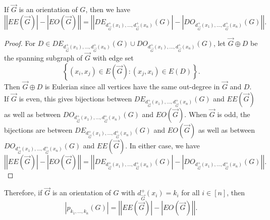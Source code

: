 \documentclass[openany]{tufte-book} %
\theoremstyle{plain}
\newcommand{\setb}[3]{\left\{ #1 \in #2 : #3 \right\}}
\newcommand{\card}[1]{\left|#1\right|}
\newcommand{\irange}[1]{\left[#1\right]}
\begin{document}
\begin{EulerianOrientationsLemma}
If $\vec{G}$ is an orientation of $G$, then we have
\[\card{|EE(\vec{G})| - |EO(\vec{G})|} = \card{|DE_{d_{\vec{G}}^+(x_1), \ldots, d_{\vec{G}}^+(x_n)}(G)|- |DO_{d_{\vec{G}}^+(x_1), \ldots, d_{\vec{G}}^+(x_n)}(G)|}.\]
\end{EulerianOrientationsLemma}
\begin{proof}
	For $D \in DE_{d_{\vec{G}}^+(x_1), \ldots, d_{\vec{G}}^+(x_n)}(G) \cup DO_{d_{\vec{G}}^+(x_1), \ldots, d_{\vec{G}}^+(x_n)}(G)$, let $\vec{G} \oplus D$ be the spanning subgraph of $\vec{G}$ with edge set 
	\[\setb{(x_i,x_j)}{E(\vec{G})}{(x_j,x_i) \in E(D)}.\]
	Then $\vec{G} \oplus D$ is Eulerian since all vertices have the same out-degree in $\vec{G}$ and $D$.  If $\vec{G}$ is even, this gives bijections between $DE_{d_{\vec{G}}^+(x_1), \ldots, d_{\vec{G}}^+(x_n)}(G)$ and $EE(\vec{G})$ as well as between $DO_{d_{\vec{G}}^+(x_1), \ldots, d_{\vec{G}}^+(x_n)}(G)$ and $EO(\vec{G})$.  When $\vec{G}$ is odd, the bijections are between $DE_{d_{\vec{G}}^+(x_1), \ldots, d_{\vec{G}}^+(x_n)}(G)$ and $EO(\vec{G})$ as well as between $DO_{d_{\vec{G}}^+(x_1), \ldots, d_{\vec{G}}^+(x_n)}(G)$ and $EE(\vec{G})$.  In either case, we have
\[\card{|EE(\vec{G})| - |EO(\vec{G})|} = \card{|DE_{d_{\vec{G}}^+(x_1), \ldots, d_{\vec{G}}^+(x_n)}(G)|- |DO_{d_{\vec{G}}^+(x_1), \ldots, d_{\vec{G}}^+(x_n)}(G)|}.\]
\end{proof} 
Therefore, if $\vec{G}$ is an orientation of $G$ with $d_{\vec{G}}^+(x_i) = k_i$ for all $i \in \irange{n}$, then
\[|p_{k_1, \ldots, k_n}(G)| = \card{|EE(\vec{G})| - |EO(\vec{G})|}.\]
\end{document}
